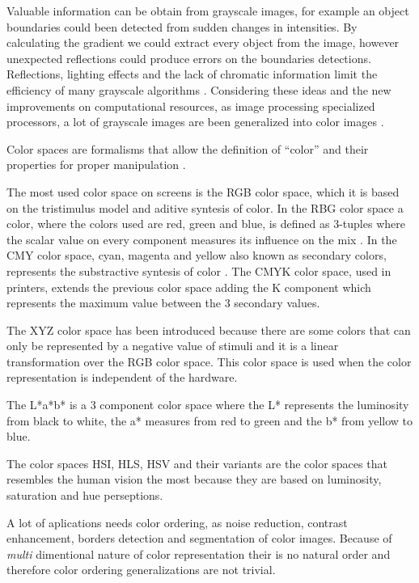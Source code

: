 Valuable information can be obtain from grayscale images, for example an object boundaries could been detected from sudden changes in intensities. By calculating the gradient  we could extract every object from the image, however unexpected reflections could produce errors on the boundaries detections. Reflections, lighting effects and the lack of chromatic information limit the efficiency of many grayscale algorithms \cite{ortiz2002procesamiento}. Considering these ideas and the new improvements on computational resources, as image processing specialized processors, a lot of grayscale images are been generalized into color images \cite{ortiz2002procesamiento}.
  
Color spaces are formalisms that allow the definition of ``color'' and their properties for proper manipulation \cite{joblove1978color,meyer1980perceptual}.

The most used color space on screens is the RGB color space, which it is based on the tristimulus model and aditive syntesis of color. In the RBG color space a color, where the colors used are red, green and blue, is defined as 3-tuples where the scalar value on every component measures its influence on the mix \cite{tkalcic2003colour}. In the CMY color space, cyan, magenta and yellow also known as secondary colors, represents the substractive syntesis of color \cite{rolleston1996color}. The CMYK color space, used in printers\cite{rolleston1996color}, extends the previous color space adding the K component which represents the maximum value between the 3 secondary values\cite{tkalcic2003colour}.

The XYZ color space has been introduced because there are some colors that can only be represented by a negative value of stimuli and it is a linear transformation over the RGB color space\cite{ortiz2002procesamiento}. This color space is used when the color representation is independent of the hardware.

The L*a*b* is a 3 component color space where the L* represents the luminosity from black to white, the a* measures from red to green and the b* from yellow to blue\cite{leon2006color}.

The color spaces HSI, HLS, HSV and their variants are the color spaces that resembles the human vision the most because they are based on luminosity, saturation and hue perseptions\cite{zamora2001comparative}.

A lot of aplications needs color ordering, as noise reduction, contrast enhancement, borders detection and segmentation of color images\cite{ortiz2002procesamiento}. Because of \textit{multi} dimentional nature of color representation their is no natural order and therefore color ordering generalizations are not trivial.

